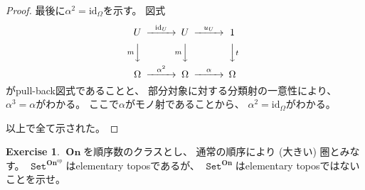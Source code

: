 \documentclass[uplatex]{jsarticle}
\theoremstyle{definition}
\newtheorem{prob}[prob]{Exercise}
\def\id{\mathrm{id}}
\newcommand{\op}{\mathrm{op}}
\DeclareMathOperator{\sfSet}{\mathtt{Set}}
\DeclareMathOperator{\On}{\mathbf{On}}
\begin{document}
\begin{proof}
  最後に\(\alpha^2 = \id_{\Omega}\)を示す。
  図式
  \[
  \begin{CD}
    U @> \id_U >> U @> u_U >> 1 \\
    @V m VV @V m VV @VV t V \\
    \Omega @>\alpha^2>> \Omega @>\alpha>> \Omega
  \end{CD}
  \]
  がpull-back図式であることと、
  部分対象に対する分類射の一意性により、
  \(\alpha^3 = \alpha\)がわかる。
  ここで\(\alpha\)がモノ射であることから、
  \(\alpha^2 = \id_{\Omega}\)がわかる。

  以上で全て示された。
\end{proof}






\begin{prob}\label{prob: 1.4}
  \(\On\)を順序数のクラスとし、
  通常の順序により (大きい) 圏とみなす。
  \(\sfSet^{\On^{\op}}\)はelementary toposであるが、
  \(\sfSet^{\On}\)はelementary toposではないことを示せ。
\end{prob}
\end{document}
